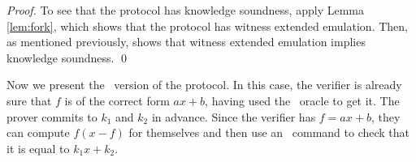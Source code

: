 \begin{proof}
To see that the protocol has knowledge soundness, apply Lemma \ref{lem:fork}, which shows that the protocol has witness extended emulation. Then, as mentioned previously,  \cite{dissertation} shows that witness extended emulation implies knowledge soundness. \qed
%
%
\end{proof}

Now we present the \ILC\ version of the protocol. In this case, the verifier is already sure that $f$ is of the correct form $ax+b$, having used the \ILCopen\ oracle to get it. The prover commits to $k_1$ and $k_2$ in advance. Since the verifier has $f = ax+b$, they can compute $f(x-f)$ for themselves and then use an \ILCcheck\ command to check that it is equal to $k_1 x+ k_2$.

